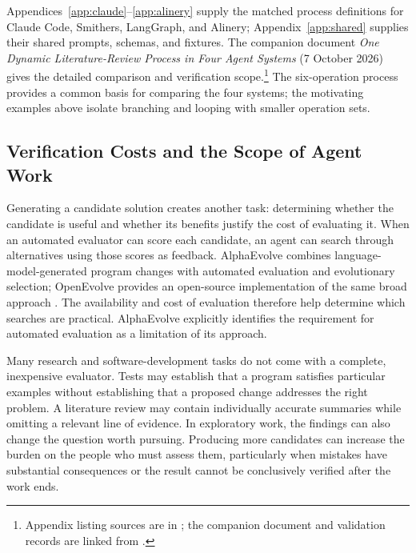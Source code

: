 \documentclass[letterpaper]{article}
\theoremstyle{definition}
\begin{document}
Appendices~\ref{app:claude}--\ref{app:alinery} supply the matched process
definitions for Claude Code, Smithers, LangGraph, and Alinery;
Appendix~\ref{app:shared} supplies their shared prompts, schemas, and fixtures.
The companion document \emph{One Dynamic Literature-Review Process in Four
Agent Systems} (7 October 2026) gives the detailed comparison and verification
scope.\footnote{Appendix listing sources are in ; the companion
document and validation records are linked from .}
The six-operation process provides a common basis for comparing the four
systems; the motivating examples above isolate branching and looping with
smaller operation sets.

\subsection{Verification Costs and the Scope of Agent Work}

Generating a candidate solution creates another task: determining whether the
candidate is useful and whether its benefits justify the cost of evaluating
it. When an automated evaluator can score each candidate, an agent can search
through alternatives using those scores as feedback. AlphaEvolve combines
language-model-generated program changes with automated evaluation and
evolutionary selection; OpenEvolve provides an open-source implementation of
the same broad approach \cite{novikov2025alphaevolve,sharma2025openevolve}.
The availability and cost of evaluation therefore help determine which
searches are practical. AlphaEvolve explicitly identifies the requirement for
automated evaluation as a limitation of its approach.

Many research and software-development tasks do not come with a complete,
inexpensive evaluator. Tests may establish that a program satisfies particular
examples without establishing that a proposed change addresses the right
problem. A literature review may contain individually accurate summaries while
omitting a relevant line of evidence. In exploratory work, the findings can
also change the question worth pursuing. Producing more candidates can
increase the burden on the people who must assess them, particularly when
mistakes have substantial consequences or the result cannot be conclusively
verified after the work ends.
\end{document}
